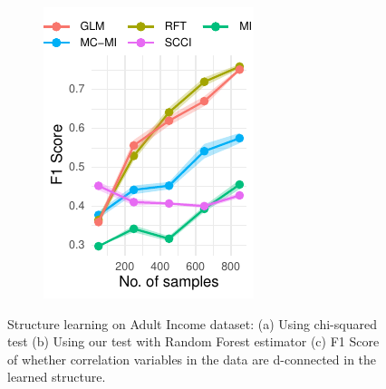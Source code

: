 \documentclass{beamer}
\begin{document}
\begin{frame}
\begin{figure}
\begin{subfigure}{.33 \textwidth}
			\caption{}
		\end{subfigure}%
		\begin{subfigure}{0.33\textwidth}
			\includegraphics[scale=0.7]{imgs/adult_F1.pdf}
			\caption{}
		\end{subfigure}
			\caption{Structure learning on Adult Income dataset:
			(a) Using chi-squared test (b) Using our test with
			Random Forest estimator (c) F1 Score of whether
			correlation variables in the data are d-connected in
			the learned structure.}
		\end{figure}
\end{frame}
\end{document}
